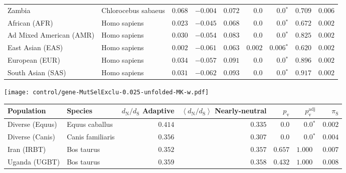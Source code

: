 \begin{center}
\begin{adjustbox}{width = 1\textwidth}
\begin{tabular}{|l|l|r|r|r|r|r|r|r|}
            Zambia        & Chlorocebus sabaeus        & $ 0.068$ & $-0.004$  & $ 0.072$ & $0.0$    & $\bm{0.0{^*}}$ & $ 0.709$ & $ 0.006$ \\
            African (AFR)               & Homo sapiens        & $ 0.023$ & $-0.045$  & $ 0.068$ & $0.0$ & $\bm{0.0{^*}}$ & $ 0.672$ & $ 0.002$ \\
            Ad Mixed American (AMR)                 & Homo sapiens        & $ 0.030$ & $-0.054$  & $ 0.083$ & $0.0$    & $\bm{0.0{^*}}$    & $ 0.825$ & $ 0.002$ \\
            East Asian (EAS)              & Homo sapiens        & $ 0.002$ & $-0.061$  & $ 0.063$ & $ 0.002$    & $\bm{ 0.006{^*}}$    & $ 0.620$ & $ 0.002$ \\
            European (EUR)              & Homo sapiens        & $ 0.034$ & $-0.057$  & $ 0.091$ & $0.0$    & $\bm{0.0{^*}}$    & $ 0.896$ & $ 0.002$ \\
            South Asian (SAS)              & Homo sapiens        & $ 0.031$ & $-0.062$  & $ 0.093$ & $0.0$    & $\bm{0.0{^*}}$    & $ 0.917$ & $ 0.002$ \\
            \bottomrule
        \end{tabular}
    \end{adjustbox}
    \newpage
    \texttt{[image: control/gene-MutSelExclu-0.025-unfolded-MK-w.pdf]}
    \begin{adjustbox}{width = 1\textwidth}
        \begin{tabular}{|l|l|r|r|r|r|r|}
            \toprule
            Population & Species & \specialcell{$d_{\mathrm{N}} / d_{\mathrm{S}}$ \\ Adaptive}                & \specialcell{$\left< d_{\mathrm{N}} / d_{\mathrm{S}} \right>$ \\ Nearly-neutral}                & $p_{\mathrm{v}}$    & $p_{\mathrm{v}}^{\mathrm{adj}}$ & $\pi_{\textrm{S}}$ \\
            \midrule
            Diverse (Equus)                    & Equus caballus          & $ 0.414$ & $ 0.335$ & $0.0$ & $\bm{0.0{^*}}$        & $ 0.002$ \\
            Diverse (Canis)                  & Canis familiaris          & $ 0.356$ & $ 0.307$ & $0.0$ & $\bm{0.0{^*}}$        & $ 0.004$ \\
            Iran (IRBT)               & Bos taurus        & $ 0.352$ & $ 0.357$ & $ 0.657$ & $ 1.000~~$        & $ 0.007$ \\
            Uganda (UGBT)                  & Bos taurus        & $ 0.359$ & $ 0.358$ & $ 0.432$ & $ 1.000~~$        & $ 0.008$ \\

\end{tabular}
\end{adjustbox}
\end{center}
